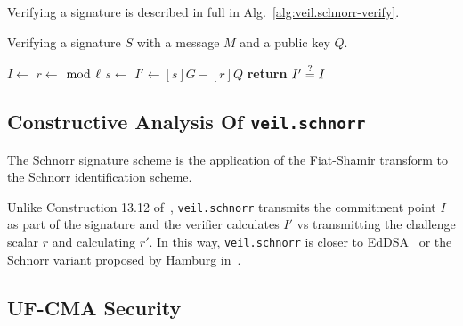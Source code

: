 Verifying a signature is described in full in Alg.~\ref{alg:veil.schnorr-verify}.

\begin{algorithm}[ht]
    \caption{
        Verifying a signature $S$ with a message $M$ and a public key $Q$.
    }
    \begin{algorithmic}
            \State {}
            \State {}
            \State
                \State {}
            \EndFor
            \State
            \State $I \gets $ 
            \State $r \gets$  $\bmod~\ell$
            \State
            \State $s \gets $ 
            \State $I' \gets [s]G - [r]Q$
            \State
            \State \textbf{return} $I' \stackrel{?}{=} I$
        \EndFunction
    \end{algorithmic}
    \label{alg:veil.schnorr-verify}
\end{algorithm}

\subsection{Constructive Analysis Of \texttt{veil.schnorr}}\label{subsec:veil.schnorr-analysis}

The Schnorr signature scheme is the application of the Fiat-Shamir transform to the Schnorr identification scheme.

Unlike Construction 13.12 of~\cite[p. 482]{katz2020}, \texttt{veil.schnorr} transmits the commitment point $I$ as part
of the signature and the verifier calculates $I'$ vs transmitting the challenge scalar $r$ and calculating $r'$.
In this way, \texttt{veil.schnorr} is closer to EdDSA~\cite{brendel2021} or the Schnorr variant proposed by Hamburg
in~\cite{hamburg2017}.

\subsection{UF-CMA Security}\label{subsec:veil.schnorr-uf-cma}

